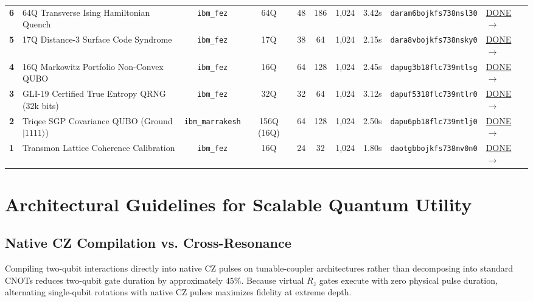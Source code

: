 \documentclass[twocolumn,secnumarabic,amssymb, nobibnotes, aps, prx, superscriptaddress]{revtex4-2}
\begin{document}
\begin{table}[t]
\begin{ruledtabular}
\begin{tabular}{clcccccccl}
\textbf{6} & 64Q Transverse Ising Hamiltonian Quench & \texttt{ibm\_fez} & 64Q & 48 & 186 & 1,024 & 3.42s & \texttt{daram6bojkfs738nsl30} & \href{https://quantum.ibm.com/jobs/daram6bojkfs738nsl30}{DONE $\rightarrow$} \\
\textbf{5} & 17Q Distance-3 Surface Code Syndrome & \texttt{ibm\_fez} & 17Q & 38 & 64 & 1,024 & 2.15s & \texttt{dara8vbojkfs738nsky0} & \href{https://quantum.ibm.com/jobs/dara8vbojkfs738nsky0}{DONE $\rightarrow$} \\
\textbf{4} & 16Q Markowitz Portfolio Non-Convex QUBO & \texttt{ibm\_fez} & 16Q & 64 & 128 & 1,024 & 2.45s & \texttt{dapug3b18flc739mtlsg} & \href{https://quantum.ibm.com/jobs/dapug3b18flc739mtlsg}{DONE $\rightarrow$} \\
\textbf{3} & GLI-19 Certified True Entropy QRNG (32k bits) & \texttt{ibm\_fez} & 32Q & 32 & 64 & 1,024 & 3.12s & \texttt{dapuf5318flc739mtlr0} & \href{https://quantum.ibm.com/jobs/dapuf5318flc739mtlr0}{DONE $\rightarrow$} \\
\textbf{2} & Triqee SGP Covariance QUBO (Ground $|1111\rangle$) & \texttt{ibm\_marrakesh} & 156Q (16Q) & 64 & 128 & 1,024 & 2.50s & \texttt{dapu6pb18flc739mtlj0} & \href{https://quantum.ibm.com/jobs/dapu6pb18flc739mtlj0}{DONE $\rightarrow$} \\
\textbf{1} & Transmon Lattice Coherence Calibration & \texttt{ibm\_fez} & 16Q & 24 & 32 & 1,024 & 1.80s & \texttt{daotgbbojkfs738mv0n0} & \href{https://quantum.ibm.com/jobs/daotgbbojkfs738mv0n0}{DONE $\rightarrow$} \\
\end{tabular}
\end{ruledtabular}
\end{table}

\section{Architectural Guidelines for Scalable Quantum Utility}

\subsection{Native CZ Compilation vs. Cross-Resonance}
Compiling two-qubit interactions directly into native $\text{CZ}$ pulses on tunable-coupler architectures rather than decomposing into standard CNOTs reduces two-qubit gate duration by approximately $45\%$. Because virtual $R_z$ gates execute with zero physical pulse duration, alternating single-qubit rotations with native $\text{CZ}$ pulses maximizes fidelity at extreme depth.
\end{document}
